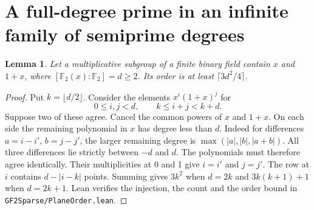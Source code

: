 \documentclass[11pt]{article}
\newtheorem{lemma}[theorem]{Lemma}
\newcommand{\F}{\mathbb F_2}
\begin{document}
\section{A full-degree prime in an infinite family of semiprime degrees}
\begin{lemma}\label{lem:plane-size}
Let a multiplicative subgroup of a finite binary field contain \(x\) and
\(1+x\), where \([\F(x):\F]=d\ge2\). Its order is at least
\(\lceil 3d^2/4\rceil\).
\end{lemma}
\begin{proof}
Put \(k=\lfloor d/2\rfloor\). Consider the elements \(x^i(1+x)^j\) for
\[
        0\le i,j<d,\qquad k\le i+j<k+d .
\]
Suppose two of these agree. Cancel the common powers of \(x\) and
\(1+x\). On each side the remaining polynomial in \(x\) has degree
less than \(d\). Indeed for differences \(a=i-i'\), \(b=j-j'\), the
larger remaining degree is \(\max(|a|,|b|,|a+b|)\). All three
differences lie strictly between \(-d\) and \(d\).
The polynomials must therefore agree identically. Their multiplicities
at 0 and 1 give \(i=i'\) and \(j=j'\).
The row at \(i\) contains \(d-|i-k|\) points. Summing gives
\(3k^2\) when \(d=2k\) and \(3k(k+1)+1\) when \(d=2k+1\). Lean verifies the injection, the count and the order
bound in \nolinkurl{GF2Sparse/PlaneOrder.lean}.
\end{proof}
\end{document}
